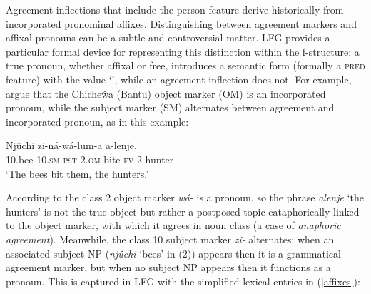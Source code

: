 Agreement inflections that include the person feature derive historically from incorporated pronominal affixes.  Distinguishing between agreement markers and affixal pronouns can be a subtle and controversial matter.  LFG provides a particular formal device for representing this distinction within the f-structure:  a true pronoun, whether affixal or free, introduces a semantic form (formally a \textsc{pred} feature) with the value `', while an agreement inflection does not.  
For example, \citet{bresnan+mchombo:1987} argue that the Chiche\^{w}a (Bantu) object marker (OM) is an incorporated pronoun, while the subject marker (SM) alternates between agreement and incorporated pronoun, as in this example: 


 \begin{exe} 
\ex	\label{bees}
{\gll Nj\^{u}chi   zi-n\'a-w\'{a}-lum-a  a-lenje. \\
 10.bee 10.\textsc{sm}-\textsc{pst}-2.\textsc{om}-bite-\textsc{fv} 2-hunter \\
\glt `The bees bit them, the hunters.' }
\end{exe}

\noindent
According to \citet{bresnan+mchombo:1987}  the class 2 object marker \textit{w\'{a}-} is a pronoun, so the phrase \textit{alenje} `the hunters' is not the true object but rather a postposed topic cataphorically linked to the object marker, with which it agrees in noun class (a case of \textit{anaphoric agreement}).  Meanwhile, the class 10 subject marker \textit{zi-} alternates: when an associated subject NP (\textit{njûchi} ‘bees’ in (2)) appears then it is a grammatical agreement marker, but when no subject NP appears then it functions as a pronoun.  This is captured in LFG with the simplified lexical entries in (\ref{affixes}):

\eal 
 \label{affixes}
 \zl 
 
